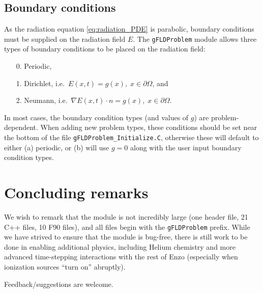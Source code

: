 \documentclass[letterpaper,10pt]{article}
\renewcommand{\(}{\left(}
\renewcommand{\)}{\right)}
\begin{document}
\subsection{Boundary conditions}
\label{sec:boundary_conditions}

As the radiation equation \eqref{eq:radiation_PDE} is parabolic,
boundary conditions must be supplied on the radiation field $E$.  The
{\tt gFLDProblem} module allows three types of boundary conditions to
be placed on the radiation field:
\begin{itemize}
\item[0.] Periodic,
\item[1.] Dirichlet, i.e.~$E(x,t) = g(x), \; x\in\partial\Omega$, and
\item[2.] Neumann, i.e.~$\nabla E(x,t)\cdot n = g(x), \; x\in\partial\Omega$.
\end{itemize}
In most cases, the boundary condition types (and values of $g$) are
problem-dependent.  When adding new problem types, these conditions
should be set near the bottom of the file {\tt gFLDProblem\_Initialize.C}, 
otherwise these will default to either (a) periodic, or (b) will use
$g=0$ along with the user input boundary condition types.



\section{Concluding remarks}
\label{sec:conclusions}

We wish to remark that the module is not incredibly large (one header
file, 21 C++ files, 10 F90 files), and all files begin with the 
{\tt gFLDProblem} prefix.  While we have strived to ensure that the
module is bug-free, there is still work to be done in enabling
additional physics, including Helium chemistry and more advanced
time-stepping interactions with the rest of Enzo (especially when
ionization sources ``turn on'' abruptly).  

Feedback/suggestions are welcome.




\end{document}
